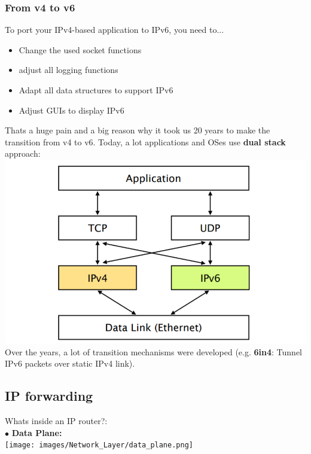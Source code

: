 \documentclass[a4paper, fontsize=8pt, landscape, DIV=1]{scrartcl}
\begin{document}
\begin{multicols*}{4}
		\subsubsection{From v4 to v6}
		To port your IPv4-based application to IPv6, you need to...
		\begin{itemize}[noitemsep]
			\item Change the used socket functions
			\item adjust all logging functions
			\item Adapt all data structures to support IPv6
			\item Adjust GUIs to display IPv6
		\end{itemize}
		Thats a huge pain and a big reason why it took us 20 years to make the transition from v4 to v6. Today, a lot applications and OSes use \textbf{dual stack} approach:\\
		\includegraphics[width=\columnwidth]{images/Network_Layer/dual_stack.png}
		Over the years, a lot of transition mechanisms were developed (e.g. \textbf{6in4}: Tunnel IPv6 packets over static IPv4 link). 
		
		\subsection{IP forwarding}
		Whats inside an IP router?:\\
		$\bullet$ \textbf{Data Plane:}\\
		\texttt{[image: images/Network\_Layer/data\_plane.png]}
		

\end{multicols*}
\end{document}
